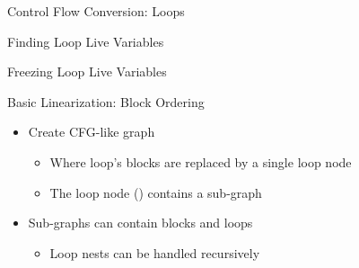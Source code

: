 \begin{frame}[fragile]{Control Flow Conversion: Loops}
\begin{minipage}[t]{0.43\linewidth}
\end{minipage}

\end{frame}


\begin{frame}{Finding Loop Live Variables}

\end{frame}


\begin{frame}{Freezing Loop Live Variables}

\end{frame}


\begin{frame}{Basic Linearization: Block Ordering}

\begin{itemize}
    \item Create CFG-like graph
    \begin{itemize}
        \item Where loop's blocks are replaced by a single loop node
        \item The loop node () contains a sub-graph
    \end{itemize}
    \item Sub-graphs can contain blocks and loops
    \begin{itemize}
        \item Loop nests can be handled recursively
    \end{itemize}
\end{itemize}


\end{frame}

